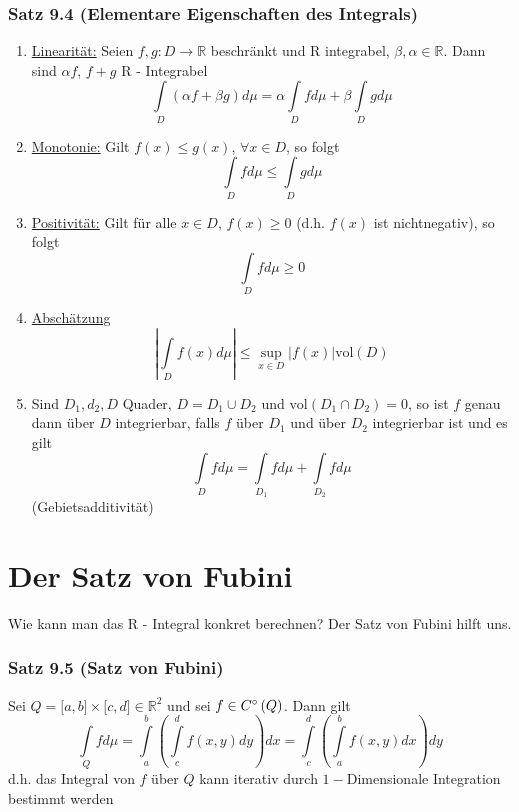 \subsubsection*{Satz 9.4 (Elementare Eigenschaften des Integrals)}
\begin{enumerate}
\item \underline{Linearität:} Seien $f,g: D\to\mathbb{R}$ beschränkt und R integrabel, $\beta,\alpha\in\mathbb{R}$. Dann sind $\alpha f$, $f+g$ R - Integrabel
\[\int\limits_D {\left( {\alpha f + \beta g} \right)d\mu  = \alpha \int\limits_D {fd\mu }  + \beta \int\limits_D {gd\mu } } \]
\item \underline{Monotonie:} Gilt $f(x)\leq g(x)$, $\forall x\in D$, so folgt \[\int\limits_D {fd\mu }  \le \int\limits_D {gd\mu } \]
\item\underline{Positivität:} Gilt für alle $x\in D$, $f(x)\geq 0$ (d.h. $f(x)$ ist nichtnegativ), so folgt \[\int\limits_D {fd\mu }  \ge 0\]
\item \underline{Abschätzung} \[\left| {\int\limits_D {f(x)d\mu } } \right| \le \mathop {\sup }\limits_{x \in D} \left| {f(x)} \right|{\text{vol}}\left( D \right)\]
\item Sind $D_1,d_2,D$ Quader, $D=D_1\cup D_2$ und $\text{vol}\left( D_1\cap D_2\right)=0$, so ist $f$ genau dann über $D$ integrierbar, falls $f$ über $D_1$ und über $D_2$ integrierbar ist und es gilt \[\int\limits_D {fd\mu }  = \int\limits_{{D_1}} {fd\mu }  + \int\limits_{{D_2}} {fd\mu } \](Gebietsadditivität)
\end{enumerate}

\section{Der Satz von Fubini}
Wie kann man das R - Integral konkret berechnen? Der Satz von Fubini hilft uns.

\subsubsection*{Satz 9.5 (Satz von Fubini)}
Sei $Q=\lbrack a,b\rbrack\times \lbrack c,d\rbrack\in\mathbb{R}^2$ und sei $f\in C\degree\left( Q\right)$. Dann gilt \[\int\limits_Q {fd\mu }  = \int\limits_a^b {\left( {\int\limits_c^d {f\left( {x,y} \right)dy} } \right)dx = \int\limits_c^d {\left( {\int\limits_a^b {f\left( {x,y} \right)dx} } \right)dy} } \]
d.h. das Integral von $f$ über $Q$ kann iterativ durch $1-$Dimensionale Integration bestimmt werden 

